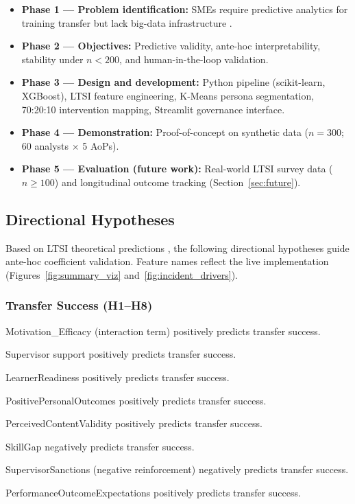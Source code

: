 \documentclass[11pt,a4paper]{article}
\begin{document}
\begin{itemize}[leftmargin=1.5em]
  \item \textbf{Phase 1 --- Problem identification:} SMEs require predictive analytics for training transfer but lack big-data infrastructure \citep{oecd2021}.
  \item \textbf{Phase 2 --- Objectives:} Predictive validity, ante-hoc interpretability, stability under $n < 200$, and human-in-the-loop validation.
  \item \textbf{Phase 3 --- Design and development:} Python pipeline (scikit-learn, XGBoost), LTSI feature engineering, K-Means persona segmentation, 70:20:10 intervention mapping, Streamlit governance interface.
  \item \textbf{Phase 4 --- Demonstration:} Proof-of-concept on synthetic data ($n = 300$; 60 analysts $\times$ 5 AoPs).
  \item \textbf{Phase 5 --- Evaluation (future work):} Real-world LTSI survey data ($n \geq 100$) and longitudinal outcome tracking (Section~\ref{sec:future}).
\end{itemize}

\subsection{Directional Hypotheses}

Based on LTSI theoretical predictions \citep{holton2000}, the following directional hypotheses guide ante-hoc coefficient validation. Feature names reflect the live implementation (Figures~\ref{fig:summary_viz} and~\ref{fig:incident_drivers}).

\subsubsection*{Transfer Success (H1--H8)}
\vspace{-4pt}
\begin{description}[leftmargin=2.5em, font=\bfseries, itemsep=2pt]
  \item[H1] Motivation\_Efficacy (interaction term) positively predicts transfer success.
  \item[H2] Supervisor support positively predicts transfer success.
  \item[H3] LearnerReadiness positively predicts transfer success.
  \item[H4] PositivePersonalOutcomes positively predicts transfer success.
  \item[H5] PerceivedContentValidity positively predicts transfer success.
  \item[H6] SkillGap negatively predicts transfer success.
  \item[H7] SupervisorSanctions (negative reinforcement) negatively predicts transfer success.
  \item[H8] PerformanceOutcomeExpectations positively predicts transfer success.
\end{description}
\end{document}
